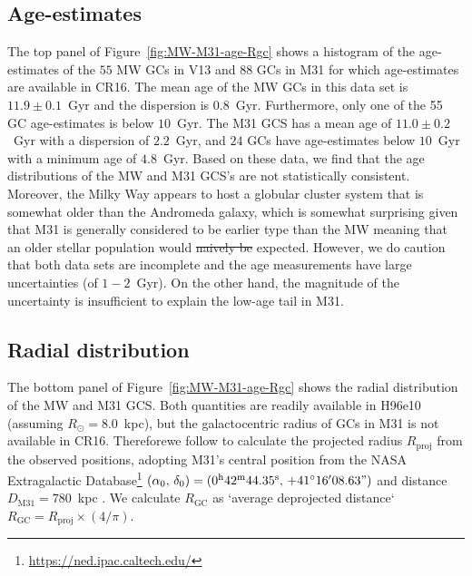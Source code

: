 \documentclass[a4paper,fleqn,usenatbib]{mnras}
\providecommand{\DIFadd}[1]{{\protect\color{blue}\uwave{#1}}} %
\providecommand{\DIFdel}[1]{{\protect\color{red}\sout{#1}}}                      %
\providecommand{\DIFaddbegin}{} %
\providecommand{\DIFaddend}{} %
\providecommand{\DIFdelbegin}{} %
\providecommand{\DIFdelend}{} %
\newcommand{\DIFscaledelfig}{0.5}
\newlength{\DIFdelgraphicswidth} %
\newlength{\DIFdelgraphicsheight} %
\newcommand{\DIFaddincludegraphics}[2][]{{\color{blue}\fbox{\DIFOincludegraphics[#1]{#2}}}} %
\newcommand{\DIFdelincludegraphics}[2][]{%
\sbox{\DIFdelgraphicsbox}{\DIFOincludegraphics[#1]{#2}}%
\settoboxwidth{\DIFdelgraphicswidth}{\DIFdelgraphicsbox} %
\settoboxtotalheight{\DIFdelgraphicsheight}{\DIFdelgraphicsbox} %
\scalebox{\DIFscaledelfig}{%
\parbox[b]{\DIFdelgraphicswidth}{\usebox{\DIFdelgraphicsbox}\\[-\baselineskip] \rule{\DIFdelgraphicswidth}{0em}}\llap{\resizebox{\DIFdelgraphicswidth}{\DIFdelgraphicsheight}{%
\setlength{\unitlength}{\DIFdelgraphicswidth}%
\begin{picture}(1,1)%
\thicklines\linethickness{2pt} %
{\color[rgb]{1,0,0}\put(0,0){\framebox(1,1){}}}%
{\color[rgb]{1,0,0}\put(0,0){\line( 1,1){1}}}%
{\color[rgb]{1,0,0}\put(0,1){\line(1,-1){1}}}%
\end{picture}%
}\hspace*{3pt}}} %
} %
\DeclareRobustCommand{\DIFaddbegin}{\DIFOaddbegin \let\includegraphics\DIFaddincludegraphics} %
\DeclareRobustCommand{\DIFaddend}{\DIFOaddend \let\includegraphics\DIFOincludegraphics} %
\DeclareRobustCommand{\DIFdelbegin}{\DIFOdelbegin \let\includegraphics\DIFdelincludegraphics} %
\DeclareRobustCommand{\DIFdelend}{\DIFOaddend \let\includegraphics\DIFOincludegraphics} %
\begin{document}
\subsection{Age-estimates}
The top panel of Figure~\ref{fig:MW-M31-age-Rgc} shows a histogram of the age-estimates
of the $55$ MW GCs in V13 and $88$ GCs in M31 for which age-estimates are available
in CR16. The mean age of the MW GCs in this data set is $11.9 \pm 0.1$~Gyr and the 
dispersion is $0.8$~Gyr. Furthermore, only one of the 55 GC age-estimates is
below $10$~Gyr. The M31 GCS has a mean age of $11.0 \pm 0.2$~Gyr with a dispersion 
of $2.2$~Gyr, and $24$ GCs have age-estimates below $10$~Gyr with a minimum age 
of $4.8$~Gyr. Based on these data, we find that the age distributions of the MW 
and M31 GCS's are not statistically consistent. Moreover, the Milky Way appears 
to host a globular cluster system that is somewhat older than the Andromeda galaxy,
which is somewhat surprising given that M31 is generally considered to be earlier
type than the MW meaning that an older stellar population would \DIFdelbegin \DIFdel{naively be }\DIFdelend \DIFaddbegin \DIFadd{be naively }\DIFaddend expected.
However, we do caution that both data sets are incomplete and the age 
measurements have large uncertainties (of $1-2$~Gyr). On the other hand, the 
magnitude of the uncertainty is insufficient to explain the low-age tail in M31.

\subsection{Radial distribution}
\label{sec:Rgc}
The bottom panel of Figure~\ref{fig:MW-M31-age-Rgc} shows the radial distribution
of the MW and M31 GCS. Both quantities are readily available in H96e10 (assuming
$R_{\odot}=8.0$~kpc), but the galactocentric radius of GCs in M31 is not available
in CR16. Therefore\DIFaddbegin \DIFadd{, }\DIFaddend we follow \citet[][Sec.~4.1]{2019arXiv190111229W} to calculate
the projected radius $R_{\text{proj}}$ from the observed positions, adopting M31's
central position from the NASA Extragalactic 
Database\footnote{\url{https://ned.ipac.caltech.edu/}} $(\alpha_0, \, \delta_0) =
(0^{\text{h}}42^{\text{m}}44.35^{\text{s}}, \, +41^{\circ}16'08.63")$
and distance $D_{\text{M31}} = 780$~kpc \citep{2005MNRAS.356..979M,2012ApJ...758...11C}.
We calculate \DIFdelbegin \DIFdel{$R_{\text{GC}}$ }\DIFdelend \DIFaddbegin \DIFadd{$R_{\text{gal}}$ }\DIFaddend as `average deprojected distance`
\DIFdelbegin \DIFdel{$R_{\text{GC}} = R_{\text{proj}} \times (4/\pi)$}\DIFdelend \DIFaddbegin \DIFadd{$R_{\text{gal}} = R_{\text{proj}} \times (4/\pi)$}\DIFaddend . 
\end{document}
